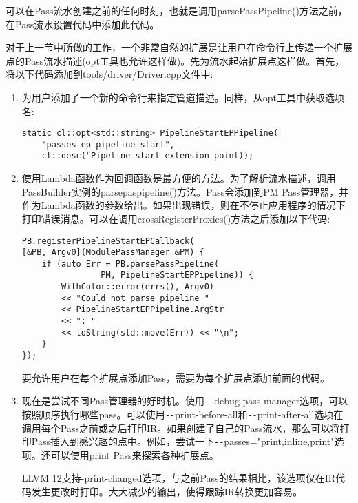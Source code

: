 可以在Pass流水创建之前的任何时刻，也就是调用parsePassPipeline()方法之前，在Pass流水设置代码中添加此代码。\par

对于上一节中所做的工作，一个非常自然的扩展是让用户在命令行上传递一个扩展点的Pass流水描述(opt工具也允许这样做)。先为流水起始扩展点这样做。首先，将以下代码添加到tools/driver/\allowbreak Driver.cpp文件中:\par

\begin{enumerate}
\item 为用户添加了一个新的命令行来指定管道描述。同样，从opt工具中获取选项名:
\begin{lstlisting}[caption={}]
static cl::opt<std::string> PipelineStartEPPipeline(
	"passes-ep-pipeline-start",
	cl::desc("Pipeline start extension point));
\end{lstlisting}

\item 使用Lambda函数作为回调函数是最方便的方法。为了解析流水描述，调用PassBuilder实例的parsepaspipeline()方法。Pass会添加到PM Pass管理器，并作为Lambda函数的参数给出。如果出现错误，则在不停止应用程序的情况下打印错误消息。可以在调用crossRegisterProxies()方法之后添加以下代码:
\begin{lstlisting}[caption={}]
PB.registerPipelineStartEPCallback(
[&PB, Argv0](ModulePassManager &PM) {
	if (auto Err = PB.parsePassPipeline(
				PM, PipelineStartEPPipeline)) {
		WithColor::error(errs(), Argv0)
		<< "Could not parse pipeline "
		<< PipelineStartEPPipeline.ArgStr 
		<< ": "
		<< toString(std::move(Err)) << "\n";
	}
});
\end{lstlisting}
\begin{tcolorbox}[colback=blue!5!white,colframe=blue!75!black, title=Tip]
要允许用户在每个扩展点添加Pass，需要为每个扩展点添加前面的代码。
\end{tcolorbox}

\item 现在是尝试不同Pass管理器的好时机。使用\verb|--|debug-pass-manager选项，可以按照顺序执行哪些pass。可以使用\verb|--|print-before-all和\verb|--|print-after-all选项在调用每个Pass之前或之后打印IR。如果创建了自己的Pass流水，那么可以将打印Pass插入到感兴趣的点中。例如，尝试一下\verb|--|passes="print,inline,print"选项。还可以使用print Pass来探索各种扩展点。

\begin{tcolorbox}[colback=blue!5!white,colframe=mymauve!75!black, title=LLVM 12的新打印选项]
LLVM 12支持-print-changed选项，与之前Pass的结果相比，该选项仅在IR代码发生更改时打印。大大减少的输出，使得跟踪IR转换更加容易。
\end{tcolorbox}


\end{enumerate}

